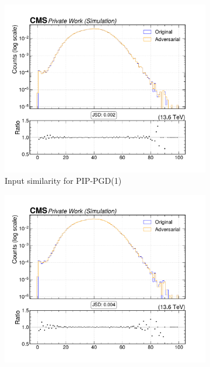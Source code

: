 \begin{figure}[htbp]
  \centering
  \begin{subfigure}[t]{0.32\textwidth}
    \includegraphics[width=\linewidth]{media/output/features/compare/combined_it_1/cmp_global_features_npv.pdf}
    \caption*{Input similarity for PIP-PGD(1)}
  \end{subfigure}\hfill
  \begin{subfigure}[t]{0.32\textwidth}
    \includegraphics[width=\linewidth]{media/output/features/compare/combined_it_2/cmp_global_features_npv.pdf}

\end{subfigure}
\end{figure}
